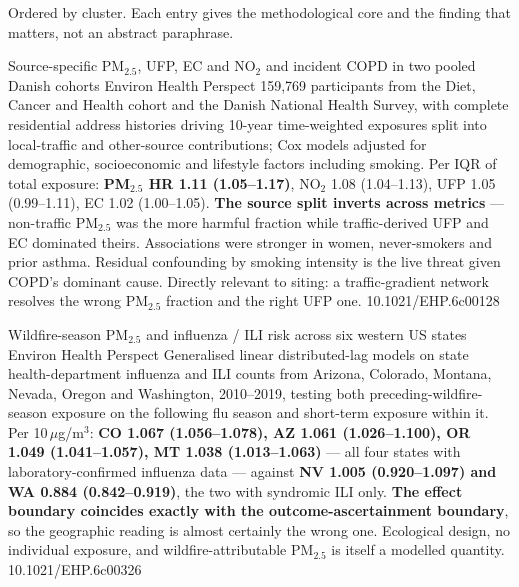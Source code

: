 \documentclass[10pt]{article}
\begin{document}
{\fontsize{7.4}{9}\selectfont\color{Slate}Ordered by cluster. Each entry gives the
methodological core and the finding that matters, not an abstract paraphrase.\par}


{Source-specific PM$_{2.5}$, UFP, EC and NO$_2$ and incident COPD in two pooled Danish cohorts}
{Environ Health Perspect}
{159{,}769 participants from the Diet, Cancer and Health cohort and the Danish National
Health Survey, with complete residential address histories driving 10-year time-weighted
exposures split into local-traffic and other-source contributions; Cox models adjusted for
demographic, socioeconomic and lifestyle factors including smoking. Per IQR of total
exposure: \textbf{PM$_{2.5}$ HR 1.11 (1.05--1.17)}, NO$_2$ 1.08 (1.04--1.13), UFP 1.05
(0.99--1.11), EC 1.02 (1.00--1.05). \textbf{The source split inverts across metrics} ---
non-traffic PM$_{2.5}$ was the more harmful fraction while traffic-derived UFP and EC
dominated theirs. Associations were stronger in women, never-smokers and prior asthma.
Residual confounding by smoking intensity is the live threat given COPD's dominant cause.
Directly relevant to siting: a traffic-gradient network resolves the wrong PM$_{2.5}$
fraction and the right UFP one.}
{10.1021/EHP.6c00128}

{Wildfire-season PM$_{2.5}$ and influenza / ILI risk across six western US states}
{Environ Health Perspect}
{Generalised linear distributed-lag models on state health-department influenza and ILI
counts from Arizona, Colorado, Montana, Nevada, Oregon and Washington, 2010--2019, testing
both preceding-wildfire-season exposure on the following flu season and short-term
exposure within it. Per 10\,$\mu$g/m$^3$: \textbf{CO 1.067 (1.056--1.078), AZ 1.061
(1.026--1.100), OR 1.049 (1.041--1.057), MT 1.038 (1.013--1.063)} --- all four states with
laboratory-confirmed influenza data --- against \textbf{NV 1.005 (0.920--1.097) and WA
0.884 (0.842--0.919)}, the two with syndromic ILI only. \textbf{The effect boundary
coincides exactly with the outcome-ascertainment boundary}, so the geographic reading is
almost certainly the wrong one. Ecological design, no individual exposure, and
wildfire-attributable PM$_{2.5}$ is itself a modelled quantity.}
{10.1021/EHP.6c00326}
\end{document}
